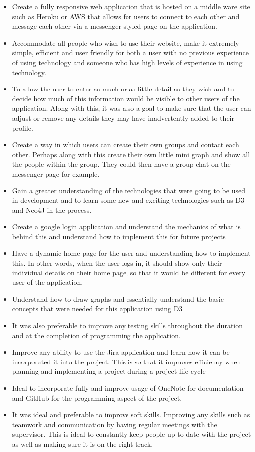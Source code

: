 \begin{itemize}
\item Create a fully responsive web application that is hosted on a middle ware site such as Heroku or AWS that allows for users to connect to each other and message each other via a messenger styled page on the application. 
\item Accommodate all people who wish to use their website, make it extremely simple, efficient and user friendly for both a user with no previous experience of using technology and someone who has high levels of experience in using technology.
\item To allow the user to enter as much or as little detail as they wish and to decide how much of this information would be visible to other users of the application. Along with this, it was also a goal to make sure that the user can adjust or remove any details they may have inadvertently added to their profile.
\item Create a way in which users can create their own groups and contact each other. Perhaps along with this create their own little mini graph and show all the people within the group. They could then have a group chat on the messenger page for example. 
\item Gain a greater understanding of the technologies that were going to be used in development and to learn some new and exciting technologies such as D3 and Neo4J in the process. 
\item Create a google login application and understand the mechanics of what is behind this and understand how to implement this for future projects
\item Have a dynamic home page for the user and understanding how to implement this. In other words, when the user logs in, it should show only their individual details on their home page, so that it would be different for every user of the application.
\item Understand how to draw graphs and essentially understand the basic concepts that were needed for this application using D3
\item It was also preferable to improve any testing skills throughout the duration and at the completion of programming the application. 
\item Improve any ability to use the Jira application and learn how it can be incorporated it into the project. This is so that it improves efficiency when planning and implementing a project during a project life cycle
\item Ideal to incorporate fully and improve usage of OneNote for documentation and GitHub for the programming aspect of the project. 
\item It was ideal and preferable to improve soft skills. Improving any skills such as teamwork and communication by having regular meetings with the supervisor. This is ideal to constantly keep people up to date with the project as well as making sure it is on the right track. 
\end{itemize}


